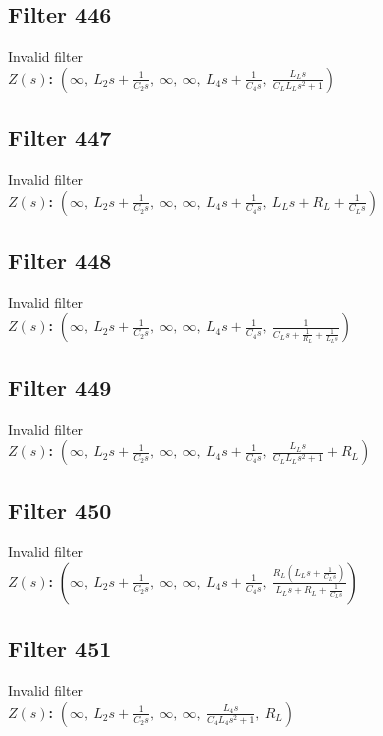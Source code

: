 \documentclass{article}
\begin{document}
\subsection*{Filter 446}
Invalid filter \\ 
\textbf{$Z(s)$:} $\left( \infty, \  L_{2} s + \frac{1}{C_{2} s}, \  \infty, \  \infty, \  L_{4} s + \frac{1}{C_{4} s}, \  \frac{L_{L} s}{C_{L} L_{L} s^{2} + 1}\right)$ \\ 
\subsection*{Filter 447}
Invalid filter \\ 
\textbf{$Z(s)$:} $\left( \infty, \  L_{2} s + \frac{1}{C_{2} s}, \  \infty, \  \infty, \  L_{4} s + \frac{1}{C_{4} s}, \  L_{L} s + R_{L} + \frac{1}{C_{L} s}\right)$ \\ 
\subsection*{Filter 448}
Invalid filter \\ 
\textbf{$Z(s)$:} $\left( \infty, \  L_{2} s + \frac{1}{C_{2} s}, \  \infty, \  \infty, \  L_{4} s + \frac{1}{C_{4} s}, \  \frac{1}{C_{L} s + \frac{1}{R_{L}} + \frac{1}{L_{L} s}}\right)$ \\ 
\subsection*{Filter 449}
Invalid filter \\ 
\textbf{$Z(s)$:} $\left( \infty, \  L_{2} s + \frac{1}{C_{2} s}, \  \infty, \  \infty, \  L_{4} s + \frac{1}{C_{4} s}, \  \frac{L_{L} s}{C_{L} L_{L} s^{2} + 1} + R_{L}\right)$ \\ 
\subsection*{Filter 450}
Invalid filter \\ 
\textbf{$Z(s)$:} $\left( \infty, \  L_{2} s + \frac{1}{C_{2} s}, \  \infty, \  \infty, \  L_{4} s + \frac{1}{C_{4} s}, \  \frac{R_{L} \left(L_{L} s + \frac{1}{C_{L} s}\right)}{L_{L} s + R_{L} + \frac{1}{C_{L} s}}\right)$ \\ 
\subsection*{Filter 451}
Invalid filter \\ 
\textbf{$Z(s)$:} $\left( \infty, \  L_{2} s + \frac{1}{C_{2} s}, \  \infty, \  \infty, \  \frac{L_{4} s}{C_{4} L_{4} s^{2} + 1}, \  R_{L}\right)$ \\ 
\end{document}
